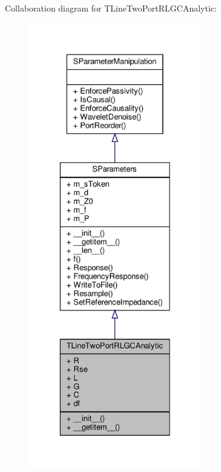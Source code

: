 Collaboration diagram for T\+Line\+Two\+Port\+R\+L\+G\+C\+Analytic\+:
\nopagebreak
\begin{figure}[H]
\begin{center}
\leavevmode
\includegraphics[height=550pt]{classSignalIntegrity_1_1SParameters_1_1Devices_1_1TLineTwoPortRLGCAnalytic_1_1TLineTwoPortRLGCAnalytic__coll__graph}
\end{center}
\end{figure}
